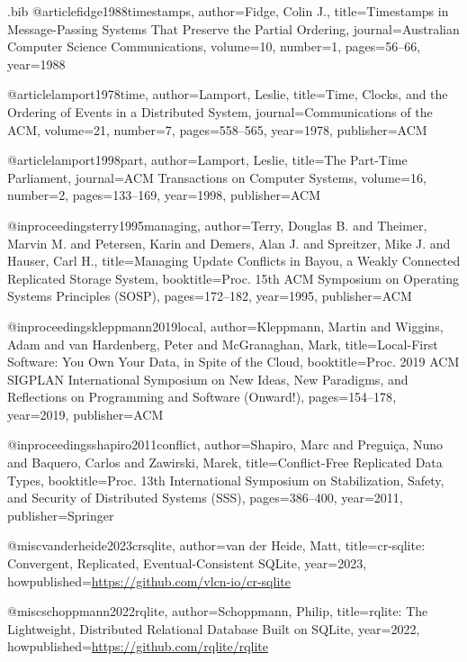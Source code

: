 \begin{filecontents*}{\jobname.bib}
@article{fidge1988timestamps,
  author={Fidge, Colin J.},
  title={Timestamps in Message-Passing Systems That Preserve the Partial Ordering},
  journal={Australian Computer Science Communications},
  volume={10},
  number={1},
  pages={56--66},
  year={1988}
}

@article{lamport1978time,
  author={Lamport, Leslie},
  title={Time, Clocks, and the Ordering of Events in a Distributed System},
  journal={Communications of the ACM},
  volume={21},
  number={7},
  pages={558--565},
  year={1978},
  publisher={ACM}
}

@article{lamport1998part,
  author={Lamport, Leslie},
  title={The Part-Time Parliament},
  journal={ACM Transactions on Computer Systems},
  volume={16},
  number={2},
  pages={133--169},
  year={1998},
  publisher={ACM}
}

@inproceedings{terry1995managing,
  author={Terry, Douglas B. and Theimer, Marvin M. and Petersen, Karin and Demers, Alan J. and Spreitzer, Mike J. and Hauser, Carl H.},
  title={Managing Update Conflicts in {Bayou}, a Weakly Connected Replicated Storage System},
  booktitle={Proc. 15th ACM Symposium on Operating Systems Principles (SOSP)},
  pages={172--182},
  year={1995},
  publisher={ACM}
}

@inproceedings{kleppmann2019local,
  author={Kleppmann, Martin and Wiggins, Adam and van Hardenberg, Peter and McGranaghan, Mark},
  title={Local-First Software: You Own Your Data, in Spite of the Cloud},
  booktitle={Proc. 2019 ACM SIGPLAN International Symposium on New Ideas, New Paradigms, and Reflections on Programming and Software (Onward!)},
  pages={154--178},
  year={2019},
  publisher={ACM}
}

@inproceedings{shapiro2011conflict,
  author={Shapiro, Marc and Pregui{\c{c}}a, Nuno and Baquero, Carlos and Zawirski, Marek},
  title={Conflict-Free Replicated Data Types},
  booktitle={Proc. 13th International Symposium on Stabilization, Safety, and Security of Distributed Systems (SSS)},
  pages={386--400},
  year={2011},
  publisher={Springer}
}

@misc{vanderheide2023crsqlite,
  author={van der Heide, Matt},
  title={{cr-sqlite}: Convergent, Replicated, Eventual-Consistent {SQLite}},
  year={2023},
  howpublished={\url{https://github.com/vlcn-io/cr-sqlite}}
}

@misc{schoppmann2022rqlite,
  author={Schoppmann, Philip},
  title={{rqlite}: The Lightweight, Distributed Relational Database Built on {SQLite}},
  year={2022},
  howpublished={\url{https://github.com/rqlite/rqlite}}
}


\end{filecontents*}
